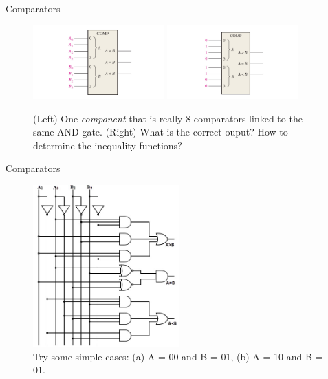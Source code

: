 \documentclass{beamer}
\begin{document}
\begin{frame}{Comparators}
\begin{figure}
\centering
\includegraphics[width=0.45\textwidth,trim=3cm 0cm 3cm 0cm,clip=true]{figures/comparator3.pdf} \hspace{0.25cm}
\includegraphics[width=0.45\textwidth,trim=3cm 0cm 3cm 0cm,clip=true]{figures/comparator4.pdf}
\caption{\label{fig:comparator3} (Left) One \textit{component} that is really 8 comparators linked to the same AND gate. (Right) What is the correct ouput? How to determine the inequality functions?}
\end{figure}
\end{frame}

\begin{frame}{Comparators}
\begin{figure}
\centering
\includegraphics[width=0.5\textwidth]{figures/2bitcomp.jpg}
\caption{\label{fig:comparator4} Try some simple cases: (a) A = 00 and B = 01, (b) A = 10 and B = 01.}
\end{figure}
\end{frame}
\end{document}
